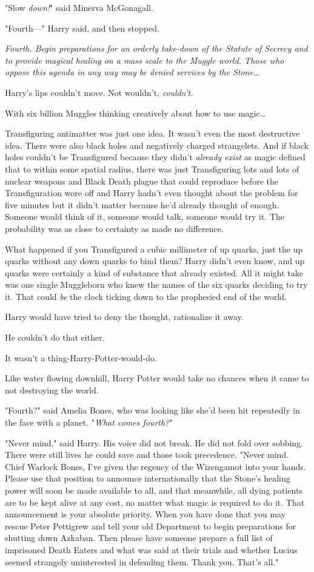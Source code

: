 "Slow \emph{down!}" said Minerva McGonagall.

"Fourth---" Harry said, and then stopped.

\emph{Fourth. Begin preparations for an orderly take-down of the Statute of
Secrecy and to provide magical healing on a mass scale to the Muggle world.
Those who oppose this agenda in any way may be denied services by the
Stone{\ldots}}

Harry's lips couldn't move. Not wouldn't, \emph{couldn't.}

With six billion Muggles thinking creatively about how to use magic{\ldots}

Transfiguring antimatter was just one idea. It wasn't even the most destructive
idea. There were also black holes and negatively charged strangelets. And if
black holes couldn't be Transfigured because they didn't \emph{already exist}
as magic defined that to within some spatial radius, there was just
Transfiguring lots and lots of nuclear weapons and Black Death plague that
could reproduce before the Transfiguration wore off and Harry hadn't even
thought about the problem for five minutes but it didn't matter because he'd
already thought of enough. Someone would think of it, someone would talk,
someone would try it. The probability was as close to certainty as made no
difference.

What happened if you Transfigured a cubic millimeter of up quarks, just the up
quarks without any down quarks to bind them? Harry didn't even know, and up
quarks were certainly a kind of substance that already existed. All it might
take was one single Muggleborn who knew the names of the six quarks deciding to
try it. That could \emph{be} the clock ticking down to the prophesied end of
the world.

Harry would have tried to deny the thought, rationalize it away.

He couldn't do that either.

It wasn't a thing-Harry-Potter-would-do.

Like water flowing downhill, Harry Potter would take no chances when it came to
not destroying the world.

"Fourth?" said Amelia Bones, who was looking like she'd been hit repeatedly in
the face with a planet. "\emph{What comes fourth?}"

"Never mind," said Harry. His voice did not break. He did not fold over
sobbing. There were still lives he could save and those took precedence. "Never
mind. Chief Warlock Bones, I've given the regency of the Wizengamot into your
hands. Please use that position to announce internationally that the Stone's
healing power will soon be made available to all, and that meanwhile, all dying
patients are to be kept alive at any cost, no matter what magic is required to
do it. That announcement is your absolute priority. When you have done that you
may rescue Peter Pettigrew and tell your old Department to begin preparations
for shutting down Azkaban. Then please have someone prepare a full list of
imprisoned Death Eaters and what was said at their trials and whether Lucius
seemed strangely uninterested in defending them. Thank you. That's all."

